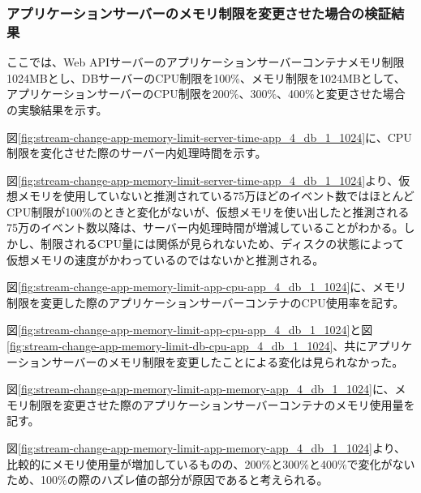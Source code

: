 \documentclass[../../../../main]{subfiles}
\begin{document}
    \subsubsection{アプリケーションサーバーのメモリ制限を変更させた場合の検証結果}\label{subsubsec:result-chunk-change-app-memory}

    ここでは、Web APIサーバーのアプリケーションサーバーコンテナメモリ制限1024MBとし、DBサーバーのCPU制限を100\%、メモリ制限を1024MBとして、アプリケーションサーバーのCPU制限を200\%、300\%、400\%と変更させた場合の実験結果を示す。


    図\ref{fig:stream-change-app-memory-limit-server-time-app_4_db_1_1024}に、CPU制限を変化させた際のサーバー内処理時間を示す。

    

    図\ref{fig:stream-change-app-memory-limit-server-time-app_4_db_1_1024}より、仮想メモリを使用していないと推測されている75万ほどのイベント数ではほとんどCPU制限が100\%のときと変化がないが、仮想メモリを使い出したと推測される75万のイベント数以降は、サーバー内処理時間が増減していることがわかる。しかし、制限されるCPU量には関係が見られないため、ディスクの状態によって仮想メモリの速度がかわっているのではないかと推測される。


    図\ref{fig:stream-change-app-memory-limit-app-cpu-app_4_db_1_1024}に、メモリ制限を変更した際のアプリケーションサーバーコンテナのCPU使用率を記す。

    

    図\ref{fig:stream-change-app-memory-limit-app-cpu-app_4_db_1_1024}と図\ref{fig:stream-change-app-memory-limit-db-cpu-app_4_db_1_1024}、共にアプリケーションサーバーのメモリ制限を変更したことによる変化は見られなかった。


    図\ref{fig:stream-change-app-memory-limit-app-memory-app_4_db_1_1024}に、メモリ制限を変更させた際のアプリケーションサーバーコンテナのメモリ使用量を記す。

    


    図\ref{fig:stream-change-app-memory-limit-app-memory-app_4_db_1_1024}より、比較的にメモリ使用量が増加しているものの、200\%と300\%と400\%で変化がないため、100\%の際のハズレ値の部分が原因であると考えられる。
\end{document}
